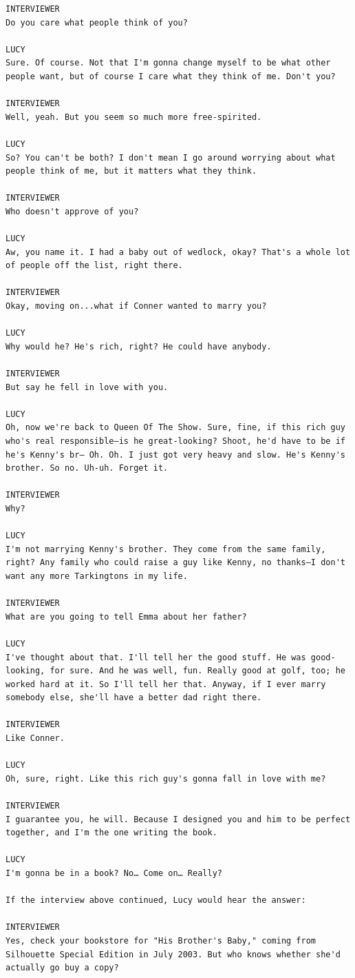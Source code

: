 \documentclass[openleft,oneside,showtrims]{memoir}
\begin{document}
\begin{lstlisting}
INTERVIEWER
Do you care what people think of you?

LUCY
Sure. Of course. Not that I'm gonna change myself to be what other people want, but of course I care what they think of me. Don't you?

INTERVIEWER
Well, yeah. But you seem so much more free-spirited.

LUCY
So? You can't be both? I don't mean I go around worrying about what people think of me, but it matters what they think.

INTERVIEWER
Who doesn't approve of you?

LUCY
Aw, you name it. I had a baby out of wedlock, okay? That's a whole lot of people off the list, right there.

INTERVIEWER
Okay, moving on...what if Conner wanted to marry you?

LUCY
Why would he? He's rich, right? He could have anybody.

INTERVIEWER
But say he fell in love with you.

LUCY
Oh, now we're back to Queen Of The Show. Sure, fine, if this rich guy who's real responsible—is he great-looking? Shoot, he'd have to be if he's Kenny's br— Oh. Oh. I just got very heavy and slow. He's Kenny's brother. So no. Uh-uh. Forget it.

INTERVIEWER
Why?

LUCY
I'm not marrying Kenny's brother. They come from the same family, right? Any family who could raise a guy like Kenny, no thanks—I don't want any more Tarkingtons in my life.

INTERVIEWER
What are you going to tell Emma about her father?

LUCY
I've thought about that. I'll tell her the good stuff. He was good-looking, for sure. And he was well, fun. Really good at golf, too; he worked hard at it. So I'll tell her that. Anyway, if I ever marry somebody else, she'll have a better dad right there.

INTERVIEWER
Like Conner.

LUCY
Oh, sure, right. Like this rich guy's gonna fall in love with me?

INTERVIEWER
I guarantee you, he will. Because I designed you and him to be perfect together, and I'm the one writing the book.

LUCY
I'm gonna be in a book? No… Come on… Really?

If the interview above continued, Lucy would hear the answer: 

INTERVIEWER
Yes, check your bookstore for "His Brother's Baby," coming from Silhouette Special Edition in July 2003. But who knows whether she'd actually go buy a copy?

\end{lstlisting}
\end{document}
